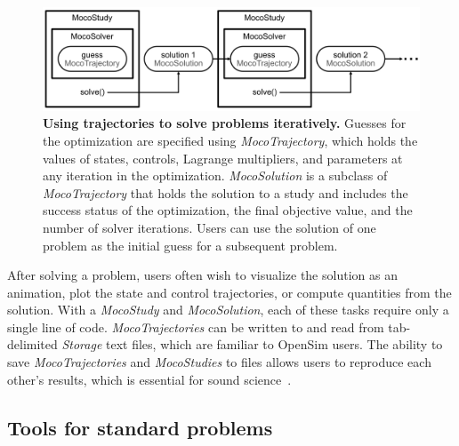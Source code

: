 \documentclass[10pt,letterpaper]{article}
\begin{document}
\begin{figure}[!h]
    \centering
    \includegraphics{../figures/MocoSolverDiagram.png}
    \caption{{\bf Using trajectories to solve problems iteratively.}
    Guesses for the optimization are specified using \textit{MocoTrajectory}, which holds the values of states, controls, Lagrange multipliers, and parameters at any iteration in the optimization. \textit{MocoSolution} is a subclass of \textit{MocoTrajectory} that holds the solution to a study and includes the success status of the optimization, the final objective value, and the number of solver iterations. Users can use the solution of one problem as the initial guess for a subsequent problem.
    }
    \label{mocosolverdiagram}
\end{figure}

After solving a problem, users often wish to visualize the solution as an animation, plot the state and control trajectories, or compute quantities from the solution. With a \textit{MocoStudy} and \textit{MocoSolution}, each of these tasks require only a single line of code. \textit{MocoTrajectories} can be written to and read from tab-delimited \textit{Storage} text files, which are familiar to OpenSim users. The ability to save \textit{MocoTrajectories} and \textit{MocoStudies} to files allows users to reproduce each other's results, which is essential for sound science~\cite{Peng:2011}.

\subsection*{Tools for standard problems}
\end{document}
